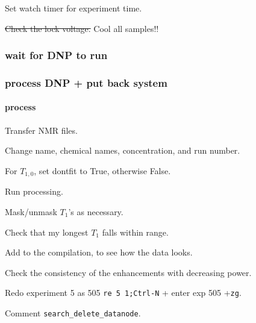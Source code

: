 \begin{scriptsize}
\begin{python}[off]
Set watch timer for experiment time.

\sout{ Check the lock voltage. }
Cool all samples!!

\subsubsection{wait for DNP to run}

\subsubsection{process DNP + put back system}
\paragraph{process}
Transfer NMR files.

Change name, chemical names, concentration, and run number.

For $T_{1,0}$, set dontfit to True, otherwise False.

Run processing.

Mask/unmask $T_1$'s as necessary.

Check that my longest $T_1$ falls within range.

Add to the compilation, to see how the data looks.

Check the consistency of the enhancements with decreasing power.

Redo experiment 5 as 505 \texttt{re 5 1;Ctrl-N} + enter exp 505 +\texttt{zg}.

Comment {\tt search\_delete\_datanode}.



\end{python}
\end{scriptsize}
